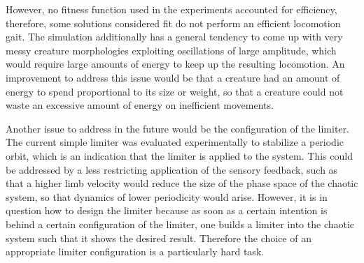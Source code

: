 \documentclass[main]{subfiles}
\begin{document}
%
However, no fitness function used in the experiments accounted for efficiency, therefore, some solutions considered fit do not perform an efficient locomotion gait. %
%
The simulation additionally has a general tendency to come up with very messy creature morphologies exploiting oscillations of large amplitude, which would require large amounts of energy to keep up the resulting locomotion. %
%
An improvement to address this issue would be that a creature had an amount of energy to spend proportional to its size or weight, so that a creature could not waste an excessive amount of energy on inefficient movements. 

Another issue to address in the future would be the configuration of the limiter. %
%
The current simple limiter was evaluated experimentally to stabilize a periodic orbit, which is an indication that the limiter is applied to the system. %
%
This could be addressed by a less restricting application of the sensory feedback, such as that a higher limb velocity would reduce the size of the phase space of the chaotic system, so that dynamics of lower periodicity would arise. %
%
However, it is in question how to design the limiter because as soon as a certain intention is behind a certain configuration of the limiter, one builds a limiter into the chaotic system such that it shows the desired result. %
%
Therefore the choice of an appropriate limiter configuration is a particularly hard task.%
\end{document}
